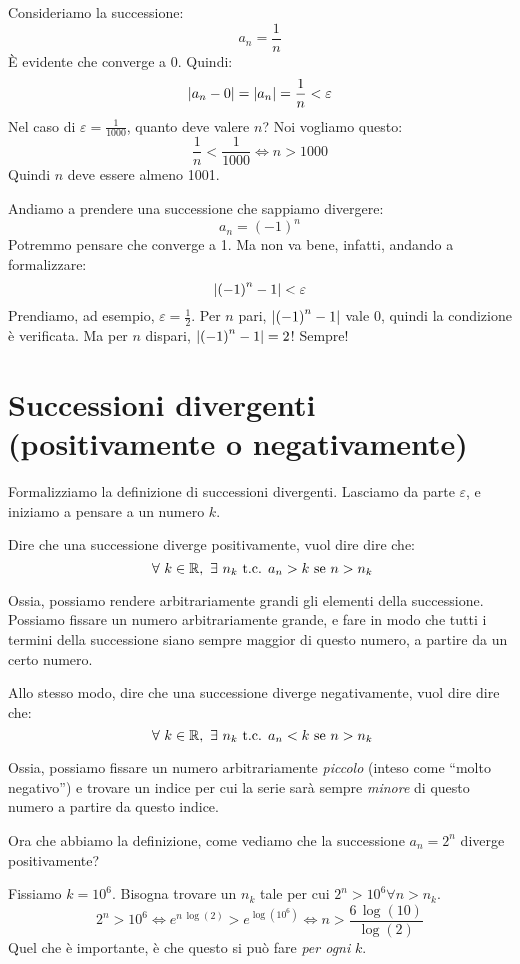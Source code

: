 Consideriamo la successione:
\[
a_n = \frac{1}{n}
\]
\`E evidente che converge a 0. Quindi:
\[
\left\lvert{a_n - 0}\right\rvert = \left\lvert{a_n}\right\rvert = \frac{1}{n} < \varepsilon
\]
Nel caso di $\varepsilon = \frac{1}{1000}$, quanto deve valere $n$? Noi vogliamo questo:
\[
\frac{1}{n} < \frac{1}{1000} \iff n > 1000
\]
Quindi $n$ deve essere almeno 1001.

Andiamo a prendere una successione che sappiamo divergere:
\[
a_n = {\left( -1 \right)}^{n}
\]
Potremmo pensare che converge a 1. Ma non va bene, infatti, andando a formalizzare:
\[
\left\lvert{ {\left( -1 \right)}^{n} - 1}\right\rvert < \varepsilon
\]
Prendiamo, ad esempio, $\varepsilon = \frac{1}{2}$. Per $n$ pari, $\left\lvert{{\left( -1 \right)}^{n} - 1}\right\rvert$ vale 0, quindi la condizione \`e verificata. Ma per $n$ dispari, $\left\lvert{ {\left( -1 \right)}^{n} - 1}\right\rvert = 2$! Sempre!

\section{Successioni divergenti (positivamente o negativamente)}

Formalizziamo la definizione di successioni divergenti. Lasciamo da parte $\varepsilon$, e iniziamo a pensare a un numero $k$. 
\begin{defn}
Dire che una successione diverge positivamente, vuol dire dire che:
\[
\forall k \in \reals , \exists n_k \text{ t.c. } a_n > k \text{ se } n > n_k
\]
\end{defn}
Ossia, possiamo rendere arbitrariamente grandi gli elementi della successione. Possiamo fissare un numero arbitrariamente grande, e fare in modo che tutti i termini della successione siano sempre maggior di questo numero, a partire da un certo numero. 
\begin{defn}
Allo stesso modo, dire che una successione diverge negativamente, vuol dire dire che:
\[
\forall k \in \reals , \exists n_k \text{ t.c. } a_n < k \text{ se } n > n_k
\]
\end{defn}
Ossia, possiamo fissare un numero arbitrariamente \emph{piccolo} (inteso come ``molto negativo'') e trovare un indice per cui la serie sar\`a sempre \emph{minore} di questo numero a partire da questo indice.

Ora che abbiamo la definizione, come vediamo che la successione $a_n = 2^n$ diverge positivamente?

Fissiamo $k = {10}^6$. Bisogna trovare un $n_k$ tale per cui $2^{n} > {10}^6 \forall n > n_k$.
\[
2^n > {10}^6 \iff e^{n \, \log (2)} > e^{\log \left( {10}^6 \right)} \iff n > \frac{6 \, \log (10 )}{\log (2)}
\]
Quel che \`e importante, \`e che questo si pu\`o fare \emph{per ogni} $k$.

